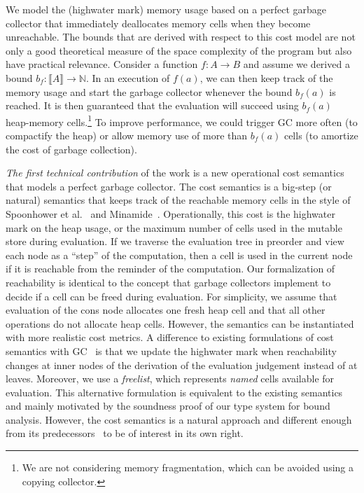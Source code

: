 \documentclass{easychair}
\newcommand{\denote}[1]{\llbracket#1\rrbracket}
\theoremstyle{definition}
\begin{document}
We model the (highwater mark) memory
usage based on a perfect garbage collector that immediately
deallocates memory cells when they become unreachable. The bounds that
are derived with respect to this cost model are not only a good theoretical
measure of the space complexity of the program but also have practical
relevance. Consider a function $f : A \to B$ and assume we derived a
bound $b_f : \denote{A} \to \mathbb{N}$. In an execution of $f(a)$, we
can then keep track of the memory usage and start the garbage
collector whenever the bound $b_f(a)$ is reached. It is then
guaranteed that the evaluation will succeed using $b_f(a)$ heap-memory
cells.\footnote{We are not considering memory fragmentation, which
  can be avoided using a copying collector.} To improve performance,
we could trigger GC more often (to compactify the heap) 
or allow memory use of more than $b_f(a)$ cells 
(to amortize the cost of garbage collection).

\emph{The first technical contribution} of the work is a new
operational cost semantics that models a perfect garbage collector.
%
The cost semantics is a big-step (or natural) semantics that keeps
track of the reachable memory cells in the style of Spoonhower et
al.~\cite{Spoonhower:2008:SPP:1411204.1411240} and
Minamide~\cite{DBLP:journals/entcs/Minamide99}. Operationally, this
cost is the highwater mark on the heap usage, or the maximum number of
cells used in the mutable store during evaluation. If we traverse the 
evaluation tree in preorder and view each node as a ``step'' 
of the computation, then a cell is used in the current node
if it is reachable from the reminder of the
computation. Our formalization of reachability is identical to the
concept that garbage collectors implement to decide if a cell can be
freed during evaluation. For simplicity, we assume that evaluation of
the cons node allocates one fresh heap cell and that all other
operations do not allocate heap cells. However, the semantics can be
instantiated with more realistic cost metrics. A difference to
existing formulations of cost semantics with
GC~\cite{Spoonhower:2008:SPP:1411204.1411240,DBLP:journals/entcs/Minamide99}
is that we update the highwater mark when reachability changes at
inner nodes of the derivation of the evaluation judgement instead of at
leaves. Moreover, we use a \emph{freelist}, which represents \emph{named}
cells available for evaluation. This alternative formulation is
equivalent to the existing semantics and mainly motivated by the
soundness proof of our type system for bound analysis.  However, the
cost semantics is a natural approach and different enough from its
predecessors~\cite{Spoonhower:2008:SPP:1411204.1411240,DBLP:journals/entcs/Minamide99}
to be of interest in its own right.
\end{document}
